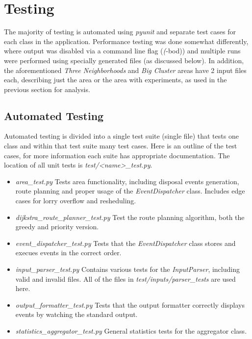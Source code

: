 \documentclass{article}
\begin{document}
		\section{Testing}
		The majority of testing is automated using \textit{pyunit} and separate test cases for each class in the application.
		Performance testing was done somewhat differently, where output was disabled via a command line flag (\textit(-bod)) and
		multiple runs were performed using specially generated files (as discussed below). In addition, the aforementioned \textit{Three Neighborhoods}
		and \textit{Big Cluster} areas have 2 input files each, describing just the area or the area with experiments, as used in the 
		previous section for analysis.

		\subsection{Automated Testing}
		Automated testing is divided into a single test suite (single file) that tests one class and within that test suite many test
		cases. Here is an outline of the test cases, for more information each suite has appropriate documentation. The location of all
		unit tests is \textit{test/<name>\_test.py}.

		\begin{itemize}
			\item \textit{area\_test.py} \- Tests area functionality, including disposal events generation, route planning
				and proper usage of the \textit{EventDispatcher} class. Includes edge cases for lorry overflow and resheduling.
			
			\item \textit{dijkstra\_route\_planner\_test.py} \- Test the route planning algorithm, both the greedy and priority version.
			
			\item \textit{event\_dispatcher\_test.py} \- Tests that the \textit{EventDispatcher} class stores and execues events
				in the correct order.

			\item \textit{input\_parser\_test.py} \- Contains various tests for the \textit{InputParser}, including valid and invalid
				files. All of the files in \textit{test/inputs/parser\_tests} are used here.

			\item \textit{output\_formatter\_test.py} \- Tests that the output formatter correctly displays events by watching the standard
				output.

			\item \textit{statistics\_aggregator\_test.py} \- General statistics tests for the aggregator class.
		\end{itemize}
\end{document}

